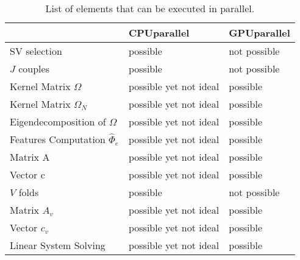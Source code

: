 \begin{table}[]
	\centering
	\begin{tabular}{lll}
		& CPUparallel            & GPUparallel  \\ \hline
		\multicolumn{1}{l|}{SV selection}                        & possible               & not possible \\
		\multicolumn{1}{l|}{$J$ couples}                         & possible               & not possible \\
		\multicolumn{1}{l|}{Kernel Matrix $\Omega$}              & possible yet not ideal & possible     \\
		\multicolumn{1}{l|}{Kernel Matrix $\Omega_N$}            & possible yet not ideal & possible     \\
		\multicolumn{1}{l|}{Eigendecomposition of $\Omega$}      & possible yet not ideal & possible     \\
		\multicolumn{1}{l|}{Features Computation $\hat{\Phi}_e$} & possible yet not ideal & possible     \\
		\multicolumn{1}{l|}{Matrix A}                            & possible yet not ideal & possible     \\
		\multicolumn{1}{l|}{Vector c}                            & possible yet not ideal & possible     \\
		\multicolumn{1}{l|}{$V$ folds}                           & possible               & not possible \\
		\multicolumn{1}{l|}{Matrix $A_v$}                        & possible yet not ideal & possible     \\
		\multicolumn{1}{l|}{Vector $c_v$}                        & possible yet not ideal & possible     \\
		\multicolumn{1}{l|}{Linear System Solving}               & possible yet not ideal & possible    
	\end{tabular}
	\caption{List of elements that can be executed in parallel.}
	\label{tab:parcandidates}
\end{table}